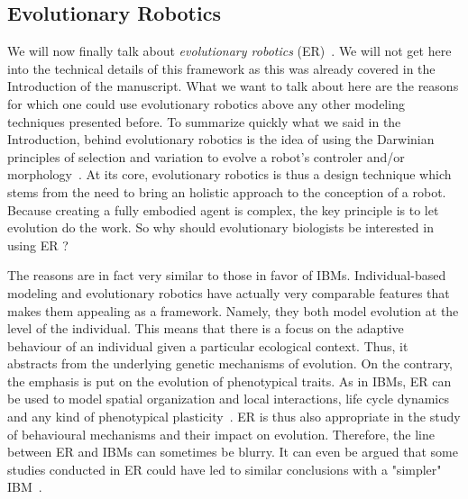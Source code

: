     \subsection{Evolutionary Robotics} 

        We will now finally talk about \emph{evolutionary robotics} (ER)~\parencite{Nolfi2000, Doncieux2015a}. We will not get here into the technical details of this framework as this was already covered in the Introduction of the manuscript. What we want to talk about here are the reasons for which one could use evolutionary robotics above any other modeling techniques presented before. To summarize quickly what we said in the Introduction, behind evolutionary robotics is the idea of using the Darwinian principles of selection and variation to evolve a robot's controler and/or morphology~\parencite{Floreano2010, Doncieux2014}. At its core, evolutionary robotics is thus a design technique which stems from the need to bring an holistic approach to the conception of a robot. Because creating a fully embodied agent is complex, the key principle is to let evolution do the work. So why should evolutionary biologists be interested in using ER ?

        The reasons are in fact very similar to those in favor of IBMs. Individual-based modeling and evolutionary robotics have actually very comparable features that makes them appealing as a framework. Namely, they both model evolution at the level of the individual. This means that there is a focus on the adaptive behaviour of an individual given a particular ecological context. Thus, it abstracts from the underlying genetic mechanisms of evolution. On the contrary, the emphasis is put on the evolution of phenotypical traits. As in IBMs, ER can be used to model spatial organization and local interactions, life cycle dynamics and any kind of phenotypical plasticity~\parencite{Mitri2012}. ER is thus also appropriate in the study of behavioural mechanisms and their impact on evolution. Therefore, the line between ER and IBMs can sometimes be blurry. It can even be argued that some studies conducted in ER could have led to similar conclusions with a "simpler" IBM~\parencite{Mitri2012}.

